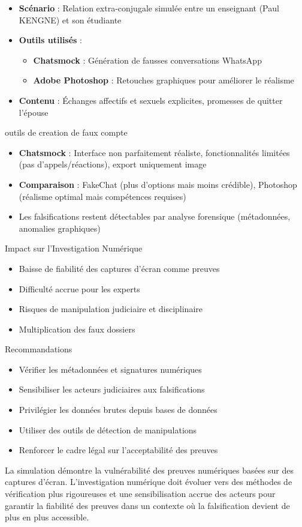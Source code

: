 \documentclass[12pt, a4em]{article}
\begin{document}
	\begin{itemize}
		\item \textbf{Scénario} : Relation extra-conjugale simulée entre un enseignant (Paul KENGNE) et son étudiante
		\item \textbf{Outils utilisés} : 
		\begin{itemize}
			\item \textbf{Chatsmock} : Génération de fausses conversations WhatsApp
			\item \textbf{Adobe Photoshop} : Retouches graphiques pour améliorer le réalisme
		\end{itemize}
		\item \textbf{Contenu} : Échanges affectifs et sexuels explicites, promesses de quitter l'épouse
	\end{itemize}
	
	outils de creation de faux compte
	\begin{itemize}
		\item \textbf{Chatsmock} : Interface non parfaitement réaliste, fonctionnalités limitées (pas d'appels/réactions), export uniquement image
		\item \textbf{Comparaison} : FakeChat (plus d'options mais moins crédible), Photoshop (réalisme optimal mais compétences requises)
		\item Les falsifications restent détectables par analyse forensique (métadonnées, anomalies graphiques)
	\end{itemize}
	
	Impact sur l'Investigation Numérique
	\begin{itemize}
		\item Baisse de fiabilité des captures d'écran comme preuves
		\item Difficulté accrue pour les experts
		\item Risques de manipulation judiciaire et disciplinaire
		\item Multiplication des faux dossiers
	\end{itemize}
	
	Recommandations
	\begin{itemize}
		\item Vérifier les métadonnées et signatures numériques
		\item Sensibiliser les acteurs judiciaires aux falsifications
		\item Privilégier les données brutes depuis bases de données
		\item Utiliser des outils de détection de manipulations
		\item Renforcer le cadre légal sur l'acceptabilité des preuves
	\end{itemize}
	
	La simulation démontre la vulnérabilité des preuves numériques basées sur des captures d'écran. L'investigation numérique doit évoluer vers des méthodes de vérification plus rigoureuses et une sensibilisation accrue des acteurs pour garantir la fiabilité des preuves dans un contexte où la falsification devient de plus en plus accessible.
	
\end{document}

